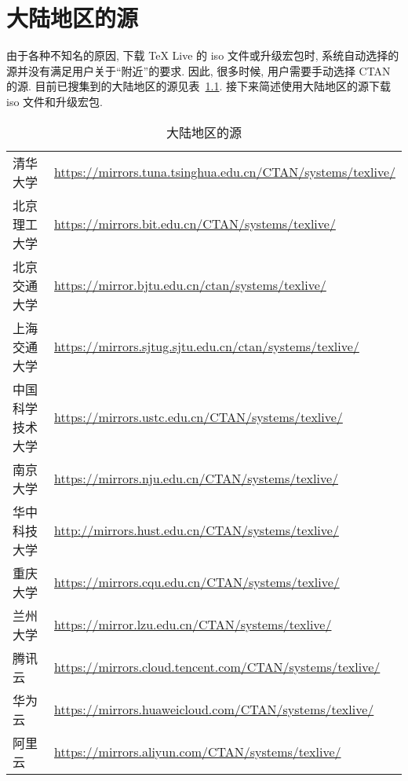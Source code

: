 
\chapter{大陆地区的源}\label{chp:appendix:mirror}

由于各种不知名的原因,
下载 \TeX{} Live 的 iso 文件或升级宏包时,
系统自动选择的源并没有满足用户关于``附近''的要求.
因此,
很多时候,
用户需要手动选择 CTAN 的源.
目前已搜集到的大陆地区的源见表~\ref{tab:appendix:mirror}.
接下来简述使用大陆地区的源下载 iso 文件和升级宏包.

\begin{table}
  \centering
  \caption{大陆地区的源}\label{tab:appendix:mirror}
  \begin{tabular}{*{2}{l}}
    \hline\hline
    清华大学 & \url{https://mirrors.tuna.tsinghua.edu.cn/CTAN/systems/texlive/}\\
    北京理工大学 & \url{https://mirrors.bit.edu.cn/CTAN/systems/texlive/}\\
    北京交通大学 & \url{https://mirror.bjtu.edu.cn/ctan/systems/texlive/}\\
    上海交通大学 & \url{https://mirrors.sjtug.sjtu.edu.cn/ctan/systems/texlive/}\\
    中国科学技术大学 & \url{https://mirrors.ustc.edu.cn/CTAN/systems/texlive/}\\
    南京大学 & \url{https://mirrors.nju.edu.cn/CTAN/systems/texlive/}\\
    华中科技大学 & \url{http://mirrors.hust.edu.cn/CTAN/systems/texlive/}\\
    重庆大学 & \url{https://mirrors.cqu.edu.cn/CTAN/systems/texlive/}\\
    兰州大学 & \url{https://mirror.lzu.edu.cn/CTAN/systems/texlive/}\\
    腾讯云 & \url{https://mirrors.cloud.tencent.com/CTAN/systems/texlive/}\\
    华为云 & \url{https://mirrors.huaweicloud.com/CTAN/systems/texlive/}\\
    阿里云 & \url{https://mirrors.aliyun.com/CTAN/systems/texlive/}\\
    \hline\hline
  \end{tabular}
\end{table}

